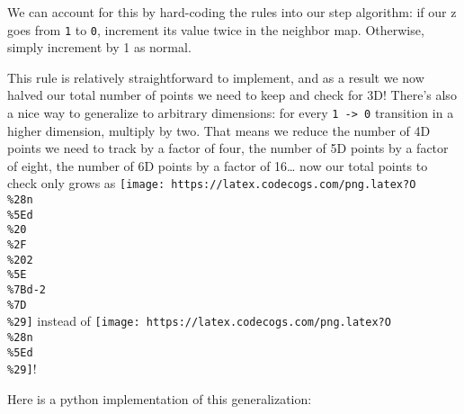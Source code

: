 \documentclass[]{article}
\begin{document}
We can account for this by hard-coding the rules into our step algorithm: if our
z goes from \texttt{1} to \texttt{0}, increment its value twice in the neighbor
map. Otherwise, simply increment by 1 as normal.

This rule is relatively straightforward to implement, and as a result we now
halved our total number of points we need to keep and check for 3D! There's also
a nice way to generalize to arbitrary dimensions: for every
\texttt{1\ -\textgreater{}\ 0} transition in a higher dimension, multiply by
two. That means we reduce the number of 4D points we need to track by a factor
of four, the number of 5D points by a factor of eight, the number of 6D points
by a factor of 16\ldots{} now our total points to check only grows as
\texttt{[image: https://latex.codecogs.com/png.latex?O\\\%28n\\\%5Ed\\\%20\\\%2F\\\%202\\\%5E\\\%7Bd-2\\\%7D\\\%29]}
instead of
\texttt{[image: https://latex.codecogs.com/png.latex?O\\\%28n\\\%5Ed\\\%29]}!

Here is a python implementation of this generalization:
\end{document}
